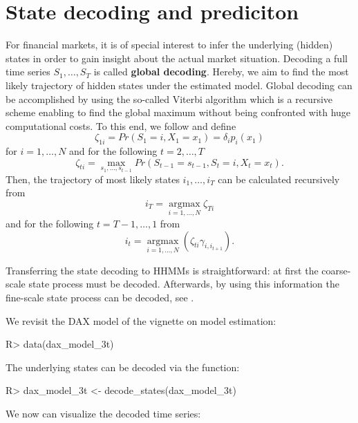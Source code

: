 \documentclass[article]{jss}
\newcommand{\fct}[1]{\code{#1()}}
\begin{document}
\section{State decoding and prediciton} \label{sec:state_decoding_and_prediction} %

For financial markets, it is of special interest to infer the underlying (hidden) states in order to gain insight about the actual market situation. Decoding a full time series $S_1, \ldots, S_T$ is called \textbf{global decoding}. Hereby, we aim to find the most likely trajectory of hidden states under the estimated model. 
Global decoding can be accomplished by using the so-called Viterbi algorithm which is a recursive scheme enabling to find the global maximum without being confronted with huge computational costs. To this end, we follow \cite{zuc16} and define
$$\zeta_{1i} = Pr(S_1 = i, X_1 = x_1) = \delta_i p_i(x_1)$$ 
for $i = 1, \ldots, N$ and for the following $t = 2, \ldots, T$
$$\zeta_{ti} = \operatorname*{max}_{s_1, \ldots, s_{t-1}} Pr(S_{t-1} = s_{t-1}, S_t = i, X_t = x_t).$$ 
Then, the trajectory of most likely states $i_1, \ldots, i_T$ can be calculated recursively from
$$i_T = \operatorname*{argmax}_{i = 1, \ldots, N} \zeta_{Ti}$$ and for the following $t = T-1, \ldots, 1$ from
$$i_t = \operatorname*{argmax}_{i = 1, \ldots, N} (\zeta_{ti} \gamma_{i, i_{t+1}}).$$

Transferring the state decoding to HHMMs is straightforward: at first the coarse-scale state process must be decoded. Afterwards, by using this information the fine-scale state process can be decoded, see \cite{ada19}.

We revisit the DAX model of the vignette on model estimation:

%
\begin{Schunk}
\begin{Sinput}
R> data(dax_model_3t)
\end{Sinput}
\end{Schunk}
%

The underlying states can be decoded via the \fct{decode\_states} function:

%
\begin{Schunk}
\begin{Sinput}
R> dax_model_3t <- decode_states(dax_model_3t)
\end{Sinput}
\end{Schunk}
%

We now can visualize the decoded time series:
\end{document}
